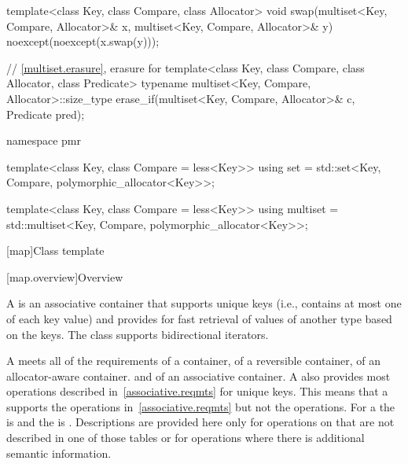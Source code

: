 \begin{codeblock}
{  template<class Key, class Compare, class Allocator>
    void swap(multiset<Key, Compare, Allocator>& x,
              multiset<Key, Compare, Allocator>& y)
      noexcept(noexcept(x.swap(y)));

  // \ref{multiset.erasure}, erasure for 
  template<class Key, class Compare, class Allocator, class Predicate>
    typename multiset<Key, Compare, Allocator>::size_type
      erase_if(multiset<Key, Compare, Allocator>& c, Predicate pred);

  namespace pmr {
    template<class Key, class Compare = less<Key>>
      using set = std::set<Key, Compare, polymorphic_allocator<Key>>;

    template<class Key, class Compare = less<Key>>
      using multiset = std::multiset<Key, Compare, polymorphic_allocator<Key>>;
  }
}
\end{codeblock}

[map]{Class template }

[map.overview]{Overview}

%
\pnum
A  is an associative container that
supports unique keys (i.e., contains at most one of each key value) and
provides for fast retrieval of values of another type  based
on the keys. The  class supports bidirectional iterators.

\pnum
A  meets all of the requirements of
a container,
of a reversible container,
of an allocator-aware container. and
of an associative container.
A
also provides most operations described in~\ref{associative.reqmts}
for unique keys.
This means that a
supports the
operations in~\ref{associative.reqmts}
but not the
operations.
For a
the
is
and the
is
.
Descriptions are provided here only for operations on
that are not described in one of those tables
or for operations where there is additional semantic information.

